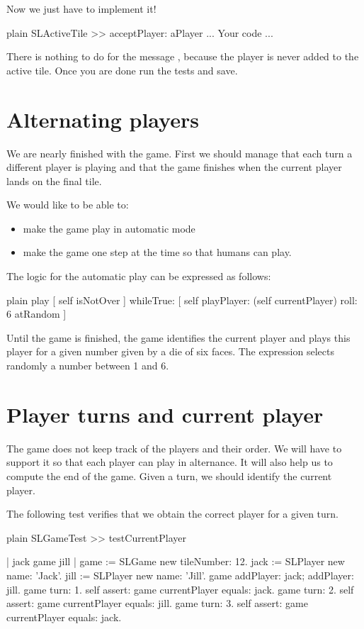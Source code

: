\documentclass[10pt,twoside,english]{_support/latex/sbabook/sbabook}
\begin{document}
Now we just have to implement it!

\begin{displaycode}{plain}
SLActiveTile >> acceptPlayer: aPlayer
	... Your code ...
\end{displaycode}

There is nothing to do for the message , because the player is never added to the active tile. Once you are done run the tests and save.
\section{Alternating players}
We are nearly finished with the game. First we should manage that each turn a different player is playing and that the game finishes when the current player lands on the final tile. 

We would like to be able to: 

\begin{itemize}
\item make the game play in automatic mode
\item make the game one step at the time so that humans can play.
\end{itemize}

The logic for the automatic play can be expressed as follows:

\begin{displaycode}{plain}
play
	[ self isNotOver ] whileTrue: [
		self playPlayer: (self currentPlayer) roll: 6 atRandom ]
\end{displaycode}

Until the game is finished, the game identifies the current player and plays this player for a given number given by a die of six faces. The expression  selects randomly a number between 1 and 6. 
\section{Player turns and current player}
The game does not keep track of the players and their order.
We will have to support it so that each player can play in alternance. It will also help us to compute the end of the game. Given a turn, we should identify the current player.

The following test verifies that we obtain the correct player for a given turn.

\begin{displaycode}{plain}
SLGameTest >> testCurrentPlayer
	
	| jack game jill |
	game := SLGame new tileNumber: 12.
	jack := SLPlayer new name: 'Jack'.
	jill := SLPlayer new name: 'Jill'.
	game addPlayer: jack; addPlayer: jill. 
	game turn: 1.
	self assert: game currentPlayer equals: jack. 
	game turn: 2.
	self assert: game currentPlayer equals: jill. 
	game turn: 3.
	self assert: game currentPlayer equals: jack. 
\end{displaycode}
\end{document}

